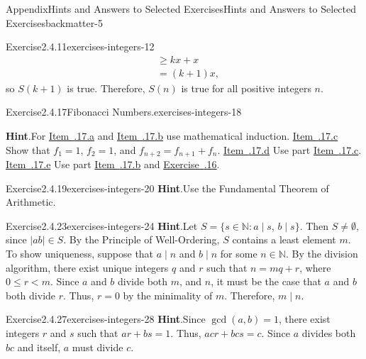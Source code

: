 \documentclass[oneside,10pt,]{book}
\newcommand{\blocktitlefont}{\relax}
\newcommand{\xreffont}{\relax}
\numberwithin{equation}{section}
\newcommand{\lt}{<}
\begin{document}
\begin{solutions-chapter}{Appendix}{Hints and Answers to Selected Exercises}{}{Hints and Answers to Selected Exercises}{}{}{backmatter-5}
\begin{divisionsolution}{Exercise}{2.4.11}{}{exercises-integers-12}
\begin{align*}
& \geq kx + x\\
& = (k + 1)x,
\end{align*}
so \(S(k + 1)\) is true. Therefore, \(S(n)\) is true for all positive integers \(n\).%
\end{divisionsolution}%
\begin{divisionsolution}{Exercise}{2.4.17}{Fibonacci Numbers.}{exercises-integers-18}%
\par\smallskip%
\noindent\textbf{\blocktitlefont Hint}.\hypertarget{exercises-integers-18-3-back}{}\quad{}For \hyperlink{fn_ineq}{Item~{\xreffont 2.4.17.a}} and \hyperlink{fn_prod}{Item~{\xreffont 2.4.17.b}} use mathematical induction. \hyperlink{fn_formula}{Item~{\xreffont 2.4.17.c}} Show that \(f_1 = 1\), \(f_2 = 1\), and \(f_{n + 2} = f_{n + 1} + f_n\). \hyperlink{fn_ratio}{Item~{\xreffont 2.4.17.d}}  Use part \hyperlink{fn_formula}{Item~{\xreffont 2.4.17.c}}. \hyperlink{fn_coprime}{Item~{\xreffont 2.4.17.e}} Use part \hyperlink{fn_prod}{Item~{\xreffont 2.4.17.b}} and \hyperlink{exercise-integers-gcd-1}{Exercise~{\xreffont 2.4.16}}.%
\end{divisionsolution}%
\begin{divisionsolution}{Exercise}{2.4.19}{}{exercises-integers-20}%
\noindent\textbf{\blocktitlefont Hint}.\hypertarget{exercises-integers-20-2-back}{}\quad{}Use the Fundamental Theorem of Arithmetic.%
\end{divisionsolution}%
\begin{divisionsolution}{Exercise}{2.4.23}{}{exercises-integers-24}%
\noindent\textbf{\blocktitlefont Hint}.\hypertarget{exercises-integers-24-2-back}{}\quad{}Let \(S = \{s \in {\mathbb N} : a \mid s\), \(b \mid s \}\). Then \(S \neq \emptyset\), since \(|ab| \in S\). By the Principle of Well-Ordering, \(S\) contains a least element \(m\). To show uniqueness, suppose that \(a \mid n\) and \(b \mid n\) for some \(n \in {\mathbb N}\). By the division algorithm, there exist unique integers \(q\) and \(r\) such that \(n = mq + r\), where \(0 \leq r \lt m\). Since \(a\) and \(b\) divide both \(m\), and \(n\), it must be the case that  \(a\) and \(b\) both divide \(r\).  Thus, \(r = 0\) by the minimality of \(m\). Therefore, \(m \mid n\).%
\end{divisionsolution}%
\begin{divisionsolution}{Exercise}{2.4.27}{}{exercises-integers-28}%
\noindent\textbf{\blocktitlefont Hint}.\hypertarget{exercises-integers-28-2-back}{}\quad{}Since \(\gcd(a,b) = 1\), there exist integers \(r\) and \(s\) such that \(ar + bs = 1\).   Thus, \(acr + bcs = c\). Since \(a\) divides both \(bc\) and itself, \(a\) must divide \(c\).%

\end{divisionsolution}
\end{solutions-chapter}
\end{document}
